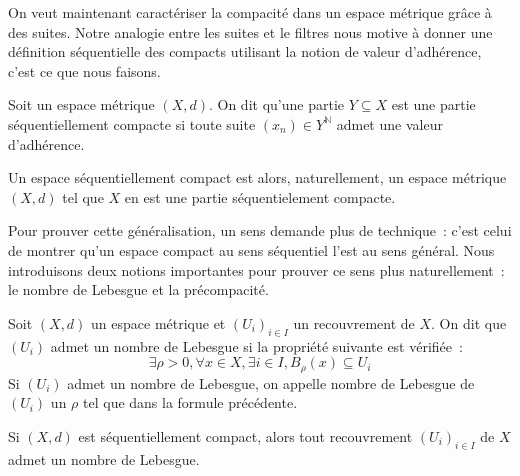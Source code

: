 On veut maintenant caractériser la compacité dans un espace métrique grâce à des
suites. Notre analogie entre les suites et le filtres nous motive à donner une
définition séquentielle des compacts utilisant la notion de valeur d'adhérence,
c'est ce que nous faisons.

\begin{definition}
  Soit un espace métrique $(X,d)$. On dit qu'une partie $Y\subseteq X$ est une
  partie séquentiellement compacte si toute suite $(x_n)\in Y^\mathbb N$ admet
  une valeur d'adhérence.
\end{definition}

Un espace séquentiellement compact est alors, naturellement, un espace métrique
$(X,d)$ tel que $X$ en est une partie séquentielement compacte.

Pour prouver cette généralisation, un sens demande plus de technique~: c'est
celui de montrer qu'un espace compact au sens séquentiel l'est au sens général.
Nous introduisons deux notions importantes pour prouver ce sens plus
naturellement~: le nombre de Lebesgue et la précompacité.

\begin{definition}
  Soit $(X,d)$ un espace métrique et $(U_i)_{i\in I}$ un recouvrement de $X$. On
  dit que $(U_i)$ admet un nombre de Lebesgue si la propriété suivante est
  vérifiée~:
  \[\exists \rho > 0,\forall x \in X, \exists i \in I, B_\rho(x) \subseteq U_i \]
  Si $(U_i)$ admet un nombre de Lebesgue, on appelle nombre de Lebesgue de $(U_i)$ un
  $\rho$ tel que dans la formule précédente.
\end{definition}

\begin{lemma}\label{lem.nb.lebesgue}
  Si $(X,d)$ est séquentiellement compact, alors tout recouvrement
  $(U_i)_{i\in I}$ de $X$ admet un nombre de Lebesgue.
\end{lemma}

